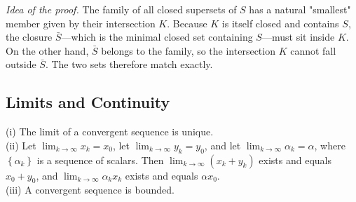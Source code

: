 \documentclass[10pt]{extarticle}
\begin{document}
\begin{remark}
    \emph{Idea of the proof.}  The family of all closed supersets of $S$ has a natural "smallest" member given by their intersection $K$.  Because $K$ is itself closed and contains $S$, the closure $\bar S$—which is the minimal closed set containing $S$—must sit inside $K$.  On the other hand, $\bar S$ belongs to the family, so the intersection $K$ cannot fall outside $\bar S$.  The two sets therefore match exactly.
\end{remark}

\subsection{Limits and Continuity}
\begin{exercise}[5.1]
    (i) The limit of a convergent sequence is unique.\\
    (ii) Let $\lim _{k \rightarrow \infty} x _k= x _0$, let $\lim _{k \rightarrow \infty} y _k= y _0$, and let $\lim _{k \rightarrow \infty} \alpha_k=\alpha$, where $\left\{\alpha_k\right\}$ is a sequence of scalars. Then $\lim _{k \rightarrow \infty}\left( x _k+ y _k\right)$ exists and equals $x _0+ y _0$, and $\lim _{k \rightarrow \infty} \alpha_k x _k$ exists and equals $\alpha x _0$.\\
    (iii) A convergent sequence is bounded.
\end{exercise}
\end{document}
